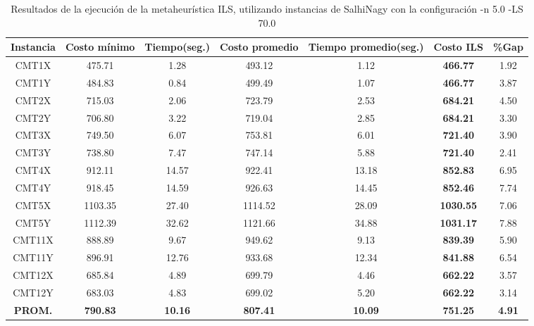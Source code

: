 \begin{table}[ht]
\caption{Resultados de la ejecución de la metaheurística ILS, utilizando instancias de SalhiNagy con la configuración -n 5.0 -LS 70.0}
\centering
\small
\begin{tabular}{c c c c c c c}
\hline\hline
Instancia & Costo mínimo & Tiempo(seg.) & Costo promedio & Tiempo promedio(seg.) & Costo ILS & \%Gap \\ [0.5ex]
\hline
CMT1X & 475.71 & 1.28 & 
493.12 & 1.12 & \bf{466.77} & 
1.92\\CMT1Y & 484.83 & 0.84 & 
499.49 & 1.07 & \bf{466.77} & 
3.87\\CMT2X & 715.03 & 2.06 & 
723.79 & 2.53 & \bf{684.21} & 
4.50\\CMT2Y & 706.80 & 3.22 & 
719.04 & 2.85 & \bf{684.21} & 
3.30\\CMT3X & 749.50 & 6.07 & 
753.81 & 6.01 & \bf{721.40} & 
3.90\\CMT3Y & 738.80 & 7.47 & 
747.14 & 5.88 & \bf{721.40} & 
2.41\\CMT4X & 912.11 & 14.57 & 
922.41 & 13.18 & \bf{852.83} & 
6.95\\CMT4Y & 918.45 & 14.59 & 
926.63 & 14.45 & \bf{852.46} & 
7.74\\CMT5X & 1103.35 & 27.40 & 
1114.52 & 28.09 & \bf{1030.55} & 
7.06\\CMT5Y & 1112.39 & 32.62 & 
1121.66 & 34.88 & \bf{1031.17} & 
7.88\\CMT11X & 888.89 & 9.67 & 
949.62 & 9.13 & \bf{839.39} & 
5.90\\CMT11Y & 896.91 & 12.76 & 
933.68 & 12.34 & \bf{841.88} & 
6.54\\CMT12X & 685.84 & 4.89 & 
699.79 & 4.46 & \bf{662.22} & 
3.57\\CMT12Y & 683.03 & 4.83 & 
699.02 & 5.20 & \bf{662.22} & 
3.14\\\bf{PROM.} & 
\bf{790.83} & \bf{10.16} & \bf{807.41} & \bf{10.09} & \bf{751.25} & \bf{4.91}\\[1ex]\hline
\end{tabular}
\label{table:nonlin}
\end{table} \clearpage
